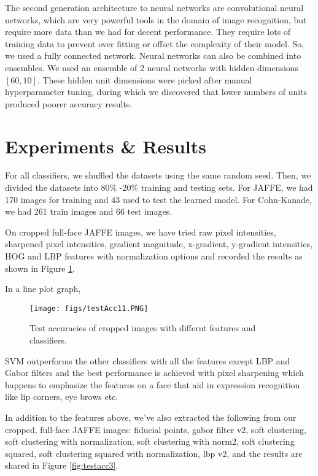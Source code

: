 \documentclass[10pt,twocolumn,letterpaper]{article}
\begin{document}
The second generation architecture to neural networks are convolutional neural networks, which are very powerful tools in the domain of image recognition, but require more data than we had for decent performance. They require lots of training data to prevent over fitting or offset the complexity of their model. So, we used a fully connected network. Neural networks can also be combined into ensembles. We used an ensemble of 2 neural networks with hidden dimensions $[60,10]$. These hidden unit dimensions were picked after manual hyperparameter tuning, during which we discovered that lower numbers of units produced poorer accuracy results.

\section{Experiments \& Results} 
For all classifiers, we shuffled the datasets using the same random seed. Then, we divided the datasets into $80\%$ -$20\%$ training and testing sets. For JAFFE, we had 170 images for training and 43 used to test the learned model. For Cohn-Kanade, we had 261 train images and 66 test images.

On cropped full-face JAFFE images, we have tried raw pixel intensities, sharpened pixel intensities, gradient magnitude, x-gradient, y-gradient intensities, HOG and LBP features with normalization options and recorded the results as shown in Figure \ref{fig:testacc1}. 

In a line plot graph,
\begin{figure}[h]
\texttt{[image: figs/testAcc11.PNG]}
\caption{Test accuracies of cropped images with differnt features and classifiers.}
\label{fig:testacc1}
\end{figure}

SVM outperforms the other classifiers with all the features except LBP and Gabor filters and the best performance is achieved with pixel sharpening which happens to emphasize the features on a face that aid in expression recognition like lip corners, eye brows etc.

In addition to the features above, we've also extracted the following from our cropped, full-face JAFFE images: fiducial points, gabor filter v2, soft clustering, soft clustering with normalization, soft clustering with norm2, soft clustering squared, soft clustering squared with normalization, lbp v2, and the results are shared in Figure \ref{fig:testacc3}. 
\end{document}
